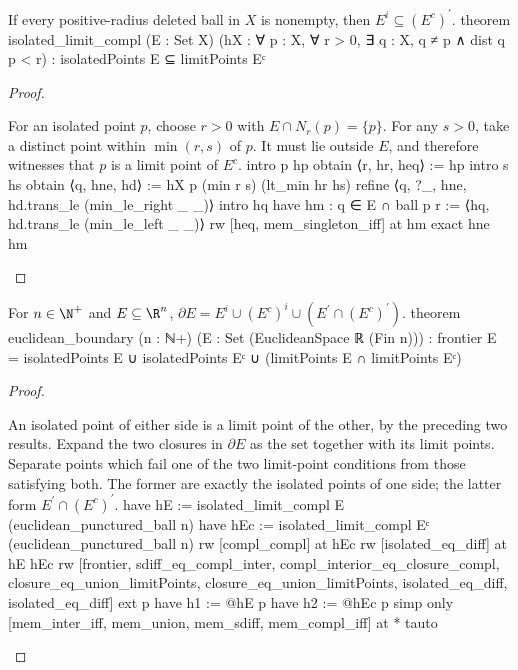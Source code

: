 \begin{lemma} \label{an1:lem:isolated-limit-compl}
  \begin{lean}{If every positive-radius deleted ball in $X$ is nonempty, then $E^{i}\subseteq(E^{c})^{\prime}$.}
    theorem isolated_limit_compl (E : Set X)
        (hX : ∀ p : X, ∀ r > 0, ∃ q : X, q ≠ p ∧ dist q p < r) :
        isolatedPoints E ⊆ limitPoints Eᶜ
  \end{lean}
\end{lemma}

\begin{proof}
  \begin{lean}{For an isolated point $p$, choose $r>0$ with $E\cap N_r(p)=\{p\}$. For any $s>0$, take a distinct point within $\min(r,s)$ of $p$. It must lie outside $E$, and therefore witnesses that $p$ is a limit point of $E^{c}$.}
    intro p hp
    obtain ⟨r, hr, heq⟩ := hp
    intro s hs
    obtain ⟨q, hne, hd⟩ := hX p (min r s) (lt_min hr hs)
    refine ⟨q, ?_, hne, hd.trans_le (min_le_right _ _)⟩
    intro hq
    have hm : q ∈ E ∩ ball p r := ⟨hq, hd.trans_le (min_le_left _ _)⟩
    rw [heq, mem_singleton_iff] at hm
    exact hne hm
  \end{lean}

\end{proof}

\begin{proposition} \label{an1:thm:properties-of-boundary-in-rn}
  \begin{lean}{For $n\in\N^{+}$ and $E\subseteq\R^{n}$, $\partial E=E^{i}\cup(E^{c})^{i}\cup(E^{\prime}\cap(E^{c})^{\prime})$.}
    theorem euclidean_boundary (n : ℕ+)
        (E : Set (EuclideanSpace ℝ (Fin n))) :
        frontier E = isolatedPoints E ∪ isolatedPoints Eᶜ ∪
          (limitPoints E ∩ limitPoints Eᶜ)
  \end{lean}
\end{proposition}

\begin{proof}
  \begin{lean}{An isolated point of either side is a limit point of the other, by the preceding two results. Expand the two closures in $\partial E$ as the set together with its limit points. Separate points which fail one of the two limit-point conditions from those satisfying both. The former are exactly the isolated points of one side; the latter form $E^{\prime}\cap(E^{c})^{\prime}$.}
    have hE := isolated_limit_compl E (euclidean_punctured_ball n)
    have hEc := isolated_limit_compl Eᶜ (euclidean_punctured_ball n)
    rw [compl_compl] at hEc
    rw [isolated_eq_diff] at hE hEc
    rw [frontier, sdiff_eq_compl_inter,
      compl_interior_eq_closure_compl, closure_eq_union_limitPoints,
      closure_eq_union_limitPoints, isolated_eq_diff, isolated_eq_diff]
    ext p
    have h1 := @hE p
    have h2 := @hEc p
    simp only [mem_inter_iff, mem_union, mem_sdiff, mem_compl_iff] at *
    tauto
  \end{lean}

\end{proof}

